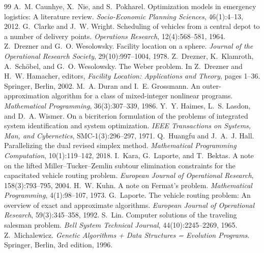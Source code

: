 \documentclass[11pt,a4paper]{article}
\theoremstyle{definition}
\begin{document}
\begingroup
\small
\begin{thebibliography}{99}
 A.~M. Caunhye, X.~Nie, and S.~Pokharel. Optimization models in emergency logistics: A literature review. \emph{Socio-Economic Planning Sciences}, 46(1):4--13, 2012.
 G.~Clarke and J.~W. Wright. Scheduling of vehicles from a central depot to a number of delivery points. \emph{Operations Research}, 12(4):568--581, 1964.
 Z.~Drezner and G.~O. Wesolowsky. Facility location on a sphere. \emph{Journal of the Operational Research Society}, 29(10):997--1004, 1978.
 Z.~Drezner, K.~Klamroth, A.~Sch{\"o}bel, and G.~O. Wesolowsky. The Weber problem. In Z.~Drezner and H.~W. Hamacher, editors, \emph{Facility Location: Applications and Theory}, pages 1--36. Springer, Berlin, 2002.
 M.~A. Duran and I.~E. Grossmann. An outer-approximation algorithm for a class of mixed-integer nonlinear programs. \emph{Mathematical Programming}, 36(3):307--339, 1986.
 Y.~Y. Haimes, L.~S. Lasdon, and D.~A. Wismer. On a bicriterion formulation of the problems of integrated system identification and system optimization. \emph{IEEE Transactions on Systems, Man, and Cybernetics}, SMC-1(3):296--297, 1971.
 Q.~Huangfu and J.~A.~J. Hall. Parallelizing the dual revised simplex method. \emph{Mathematical Programming Computation}, 10(1):119--142, 2018.
 I.~Kara, G.~Laporte, and T.~Bektas. A note on the lifted Miller--Tucker--Zemlin subtour elimination constraints for the capacitated vehicle routing problem. \emph{European Journal of Operational Research}, 158(3):793--795, 2004.
 H.~W. Kuhn. A note on Fermat's problem. \emph{Mathematical Programming}, 4(1):98--107, 1973.
 G.~Laporte. The vehicle routing problem: An overview of exact and approximate algorithms. \emph{European Journal of Operational Research}, 59(3):345--358, 1992.
 S.~Lin. Computer solutions of the traveling salesman problem. \emph{Bell System Technical Journal}, 44(10):2245--2269, 1965.
 Z.~Michalewicz. \emph{Genetic Algorithms + Data Structures = Evolution Programs}. Springer, Berlin, 3rd edition, 1996.

\end{thebibliography}
\end{document}

